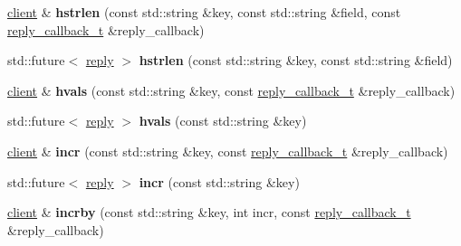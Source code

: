 \begin{DoxyCompactItemize}
\mbox{\label{classcpp__redis_1_1client_a5e1543cd782d3ff9d17de5e200fd038a}} 
\hyperlink{classcpp__redis_1_1client}{client} \& {\bfseries hstrlen} (const std\+::string \&key, const std\+::string \&field, const \hyperlink{classcpp__redis_1_1client_a061a1140d36d2eaeda82b09a0bb3f9f2}{reply\+\_\+callback\+\_\+t} \&reply\+\_\+callback)
\item 
\mbox{\label{classcpp__redis_1_1client_a612c5f64a9fec6c8c2df8b113173146a}} 
std\+::future$<$ \hyperlink{classcpp__redis_1_1reply}{reply} $>$ {\bfseries hstrlen} (const std\+::string \&key, const std\+::string \&field)
\item 
\mbox{\label{classcpp__redis_1_1client_af74a8adbcd6f21178b43f3f2edddb472}} 
\hyperlink{classcpp__redis_1_1client}{client} \& {\bfseries hvals} (const std\+::string \&key, const \hyperlink{classcpp__redis_1_1client_a061a1140d36d2eaeda82b09a0bb3f9f2}{reply\+\_\+callback\+\_\+t} \&reply\+\_\+callback)
\item 
\mbox{\label{classcpp__redis_1_1client_af391940cf5b996a0682e881da446b7da}} 
std\+::future$<$ \hyperlink{classcpp__redis_1_1reply}{reply} $>$ {\bfseries hvals} (const std\+::string \&key)
\item 
\mbox{\label{classcpp__redis_1_1client_a2f9ba6c7e83451207403096b19da4faa}} 
\hyperlink{classcpp__redis_1_1client}{client} \& {\bfseries incr} (const std\+::string \&key, const \hyperlink{classcpp__redis_1_1client_a061a1140d36d2eaeda82b09a0bb3f9f2}{reply\+\_\+callback\+\_\+t} \&reply\+\_\+callback)
\item 
\mbox{\label{classcpp__redis_1_1client_a36ce71119f98cdc29fb29ca33c8b1ff1}} 
std\+::future$<$ \hyperlink{classcpp__redis_1_1reply}{reply} $>$ {\bfseries incr} (const std\+::string \&key)
\item 
\mbox{\label{classcpp__redis_1_1client_a7ee625ebbbfc9fb6f9821b94055e0a5c}} 
\hyperlink{classcpp__redis_1_1client}{client} \& {\bfseries incrby} (const std\+::string \&key, int incr, const \hyperlink{classcpp__redis_1_1client_a061a1140d36d2eaeda82b09a0bb3f9f2}{reply\+\_\+callback\+\_\+t} \&reply\+\_\+callback)

\end{DoxyCompactItemize}
